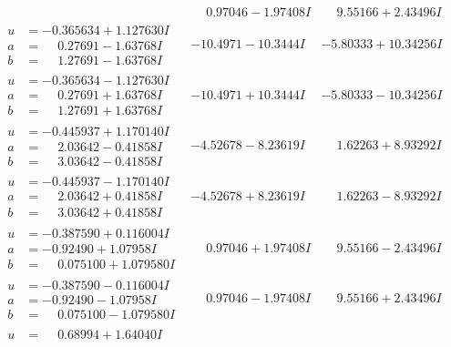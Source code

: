 \documentclass[1p]{elsarticle_modified}
\theoremstyle{definition}
\begin{document}
$$\begin{array}{c|c|c}
 & \phantom{-}0.97046 - 1.97408 I & \phantom{-}9.55166 + 2.43496 I \\ \hline\begin{aligned}
u &= -0.365634 + 1.127630 I \\
a &= \phantom{-}0.27691 - 1.63768 I \\
b &= \phantom{-}1.27691 - 1.63768 I\end{aligned}
 & -10.4971 - 10.3444 I & -5.80333 + 10.34256 I \\ \hline\begin{aligned}
u &= -0.365634 - 1.127630 I \\
a &= \phantom{-}0.27691 + 1.63768 I \\
b &= \phantom{-}1.27691 + 1.63768 I\end{aligned}
 & -10.4971 + 10.3444 I & -5.80333 - 10.34256 I \\ \hline\begin{aligned}
u &= -0.445937 + 1.170140 I \\
a &= \phantom{-}2.03642 - 0.41858 I \\
b &= \phantom{-}3.03642 - 0.41858 I\end{aligned}
 & -4.52678 - 8.23619 I & \phantom{-}1.62263 + 8.93292 I \\ \hline\begin{aligned}
u &= -0.445937 - 1.170140 I \\
a &= \phantom{-}2.03642 + 0.41858 I \\
b &= \phantom{-}3.03642 + 0.41858 I\end{aligned}
 & -4.52678 + 8.23619 I & \phantom{-}1.62263 - 8.93292 I \\ \hline\begin{aligned}
u &= -0.387590 + 0.116004 I \\
a &= -0.92490 + 1.07958 I \\
b &= \phantom{-}0.075100 + 1.079580 I\end{aligned}
 & \phantom{-}0.97046 + 1.97408 I & \phantom{-}9.55166 - 2.43496 I \\ \hline\begin{aligned}
u &= -0.387590 - 0.116004 I \\
a &= -0.92490 - 1.07958 I \\
b &= \phantom{-}0.075100 - 1.079580 I\end{aligned}
 & \phantom{-}0.97046 - 1.97408 I & \phantom{-}9.55166 + 2.43496 I \\ \hline\begin{aligned}
u &= \phantom{-}0.68994 + 1.64040 I \\

\end{aligned}
\end{array}$$
\end{document}
